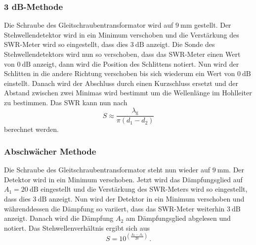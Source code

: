\subsubsection{3 dB-Methode}
Die Schraube des Gleitschraubentransformator wird auf $\SI{9}{\milli\meter}$ gestellt.
Der Stehwellendetektor wird in ein Minimum verschoben und die Verstärkung des SWR-Meter wird so eingestellt, dass dies $\SI{3}{\dB}$ anzeigt.
Die Sonde des Stehwellendetektors wird nun so verschoben, dass das SWR-Meter einen Wert von $\SI{0}{\dB}$ anzeigt, dann wird die Position des Schlittens notiert.
Nun wird der Schlitten in die andere Richtung verschoben bis sich wiederum ein Wert von $\SI{0}{\dB}$ einstellt.
Danach wird der Abschluss durch einen Kurzschluss ersetzt und der Abstand zwischen zwei Minimas wird bestimmt um die Wellenlänge im Hohlleiter zu bestimmen.
Das SWR kann nun nach 
\begin{equation}
    S \approx \frac{\lambda _\text{g}}{\pi \left ( d_1 - d_2 \right )}
    \label{eq:3db_SWR}
\end{equation}
berechnet werden.

\subsubsection{Abschwächer Methode}
\label{sec:abschwaecher_methode}
Die Schraube des Gleitschraubentransformator steht nun wieder auf $\SI{9}{\milli \meter}$.
Der Detektor wird in ein Minimum verschoben.
Jetzt wird das Dämpfungsglied auf $A_1 = \SI{20}{\dB}$ eingestellt und die Verstärkung des SWR-Meters wird so eingestellt, dass dies $\SI{3}{\dB}$ anzeigt.
Nun wird der Detektor in ein Minimum verschoben und währenddessen die Dämpfung so variiert, dass das SWR-Meter weiterhin $\SI{3}{\dB}$ anzeigt.
Danach wird die Dämpfung $A_2$ am Dämpfungsglied abgelesen und notiert.
Das Stehwellenverhältnis ergibt sich aus
\begin{equation}
    S = 10^{\left (\frac{A_2 -A_1}{20} \right )} \, .
    \label{eq:daempfung_SWR}
\end{equation}